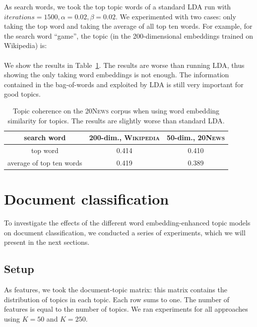 \documentclass[
        a4paper,
        titlepage,
        twoside,
        parskip
        ]{scrbook}
\newcommand{\ra}[1]{\renewcommand{\arraystretch}{#1}}
\theoremstyle{break}
\begin{document}
As search words, we took the top topic words of a standard LDA run with $iterations=1500, \alpha=0.02, \beta=0.02$.
We experimented with two cases: only taking the top word and taking the average of all top ten words.
For example, for the search word ``game'', the topic (in the 200-dimensional embeddings trained on Wikipedia) is: \\
\hspace*{0cm}  \\

We show the results in Table~\ref{table:raw_we_tm}.
The results are worse than running LDA, thus showing the only taking word embeddings is not enough.
The information contained in the bag-of-words and exploited by LDA is still very important for good topics.
\begin{table}[]
  \ra{1.3}
  \centering
  \caption{Topic coherence on the \textsc{20News} corpus when using word embedding similarity for topics. The results are slightly worse than standard LDA.}
  \label{table:raw_we_tm}
  \begin{tabular}{ccc}
    \toprule
    \textbf{search word}     & \textbf{200-dim., \textsc{Wikipedia}} & \textbf{50-dim., \textsc{20News}} \\
    \midrule
    top word                 & 0.414                        & 0.410                    \\
    average of top ten words & 0.419                        & 0.389 \\
    \bottomrule
  \end{tabular}
\end{table}

\section{Document classification}

To investigate the effects of the different word embedding-enhanced topic models on document classification, we conducted a series of experiments, which we will present in the next sections.

\subsection{Setup}

As features, we took the document-topic matrix: this matrix contains the distribution of topics in each topic.
Each row sums to one.
The number of features is equal to the number of topics.
We ran experiments for all approaches using $K = 50$ and $K = 250$.
\end{document}

